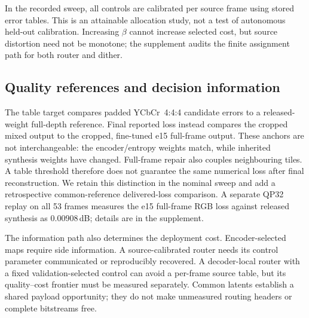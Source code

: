 In the recorded sweep, all controls are calibrated per source frame using
stored error tables. This is an attainable allocation study, not a test of
autonomous held-out calibration. Increasing $\beta$ cannot increase selected
cost, but source distortion need not be monotone; the supplement audits the
finite assignment path for both router and dither.

\subsection{Quality references and decision information}

The table target compares padded YCbCr~4:4:4 candidate errors to a released-weight
full-depth reference. Final reported loss instead compares the cropped mixed
output to the cropped, fine-tuned e15 full-frame output. These anchors are
not interchangeable: the encoder/entropy weights match, while inherited
synthesis weights have changed. Full-frame repair also couples neighbouring
tiles. A table threshold therefore does not guarantee the same numerical
loss after final reconstruction. We retain this distinction in the nominal
sweep and add a retrospective common-reference delivered-loss comparison.
A separate QP32 replay on all 53 frames measures the e15 full-frame RGB loss
against released synthesis as 0.00908\,dB; details are in the supplement.

The information path also determines the deployment cost. Encoder-selected
maps require side information. A source-calibrated router needs its control
parameter communicated or reproducibly recovered. A decoder-local router
with a fixed validation-selected control can avoid a per-frame source table,
but its quality--cost frontier must be measured separately. Common latents
establish a shared payload opportunity; they do not make unmeasured routing
headers or complete bitstreams free.
